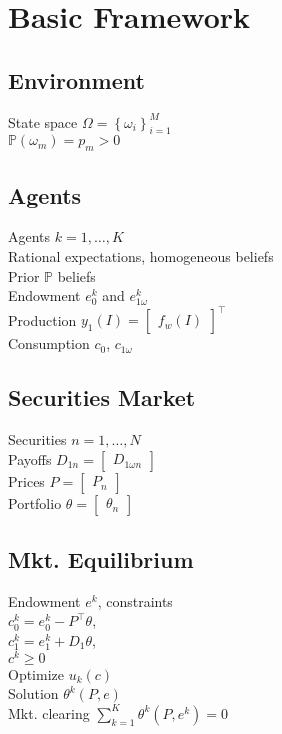 \section{Basic Framework}
	\subsection*{Environment}
	State space $\Omega = \left\{\omega_{i}\right\}_{i = 1}^{M}$\\
	$\mathbb{P}\left(\omega_{m}\right) = p_{m} > 0$
	
	\subsection*{Agents}
	Agents $k = 1, \dots, K$\\
	Rational expectations, homogeneous beliefs\\
	Prior $\mathbb{P}$ beliefs\\
	Endowment $e_{0}^{k}$ and $e_{1\omega}^{k}$\\
	Production $y_{1}\left(I\right) = \begin{bmatrix}f_{w}\left(I\right)\end{bmatrix}^{\intercal}$\\
	Consumption $c_{0}$, $c_{1\omega}$
	
	\subsection*{Securities Market}
	Securities $n = 1, \dots, N$\\
	Payoffs $D_{1n} = \begin{bmatrix}D_{1\omega n}\end{bmatrix}$\\
	Prices $P = \begin{bmatrix}P_{n}\end{bmatrix}$\\
	Portfolio $\theta = \begin{bmatrix}\theta_{n}\end{bmatrix}$
	
	\subsection*{Mkt. Equilibrium}
	Endowment $e^{k}$, constraints\\
	$c_{0}^{k} = e_{0}^{k} - P^{\intercal}\theta$,\\
	$c_{1}^{k} = e_{1}^{k} + D_{1}\theta$,\\
	$c^{k}\geq 0$\\
	Optimize $u_{k}\left(c\right)$\\
	Solution $\theta^{k}\left(P, e\right)$\\
	Mkt. clearing $\sum_{k = 1}^{K}\theta^{k}\left(P, e^{k}\right) = 0$
	